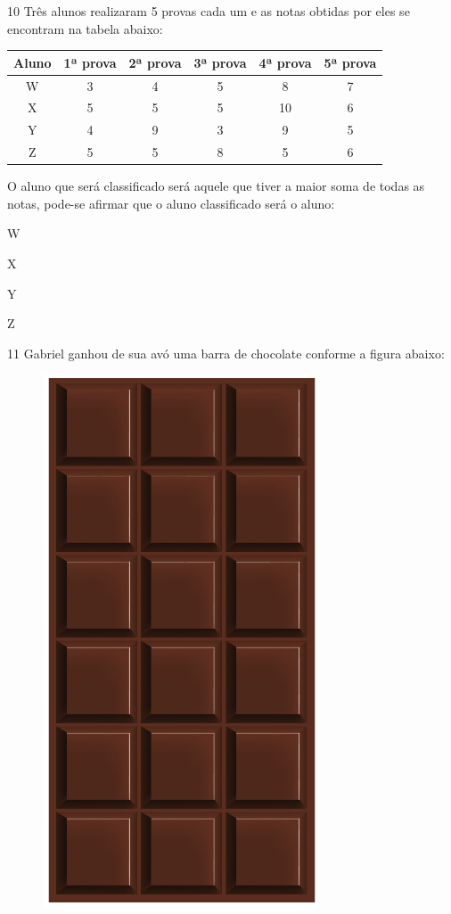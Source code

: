 \num{10} Três alunos realizaram 5 provas cada um e as notas obtidas por
eles se encontram na tabela abaixo:

\begin{center}
\begin{tabular}{c|ccccc}
\hline
\multicolumn{1}{l|}{\textbf{Aluno}} & \multicolumn{1}{l}{\textbf{1ª prova}} & \multicolumn{1}{l}{\textbf{2ª prova}} & \multicolumn{1}{l}{\textbf{3ª prova}} & \multicolumn{1}{l}{\textbf{4ª prova}} & \multicolumn{1}{l}{\textbf{5ª prova}} \\ \hline
W & 3 & 4 & 5 & 8 & 7 \\ \hline
X & 5 & 5 & 5 & 10 & 6 \\ \hline
Y & 4 & 9 & 3 & 9 & 5 \\ \hline
Z & 5 & 5 & 8 & 5 & 6 \\ \hline
\end{tabular}
\end{center}

O aluno que será classificado será aquele que tiver a maior
soma de todas as notas, pode-se afirmar que o aluno classificado será o
aluno:

\begin{minipage}{.5\textwidth}
\begin{escolha}
\item
  W
\item
  X
\item
  Y
\item
  Z
\end{escolha}
\end{minipage}

\num{11} Gabriel ganhou de sua avó uma barra de chocolate conforme a 
figura abaixo:

\begin{figure}[htpb!]
\centering
\includegraphics[width=.2\textwidth]{../ilustracoes/MAT5/SAEB_5ANO_MAT_figura120.png}
\end{figure}

